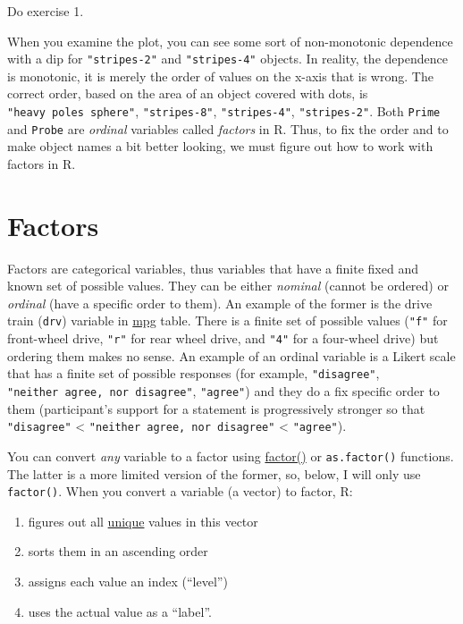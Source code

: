 \documentclass[
]{book}
\providecommand{\tightlist}{%
  \setlength{\itemsep}{0pt}\setlength{\parskip}{0pt}}
\begin{document}
Do exercise 1.

When you examine the plot, you can see some sort of non-monotonic dependence with a dip for \texttt{"stripes-2"} and \texttt{"stripes-4"} objects. In reality, the dependence is monotonic, it is merely the order of values on the x-axis that is wrong. The correct order, based on the area of an object covered with dots, is \texttt{"heavy\ poles\ sphere"}, \texttt{"stripes-8"}, \texttt{"stripes-4"}, \texttt{"stripes-2"}. Both \texttt{Prime} and \texttt{Probe} are \emph{ordinal} variables called \emph{factors} in R. Thus, to fix the order and to make object names a bit better looking, we must figure out how to work with factors in R.

\hypertarget{factors}{%
\section{Factors}\label{factors}}

Factors are categorical variables, thus variables that have a finite fixed and known set of possible values. They can be either \emph{nominal} (cannot be ordered) or \emph{ordinal} (have a specific order to them). An example of the former is the drive train (\texttt{drv}) variable in \href{https://ggplot2.tidyverse.org/reference/mpg.html}{mpg} table. There is a finite set of possible values (\texttt{"f"} for front-wheel drive, \texttt{"r"} for rear wheel drive, and \texttt{"4"} for a four-wheel drive) but ordering them makes no sense. An example of an ordinal variable is a Likert scale that has a finite set of possible responses (for example, \texttt{"disagree"}, \texttt{"neither\ agree,\ nor\ disagree"}, \texttt{"agree"}) and they do a fix specific order to them (participant's support for a statement is progressively stronger so that \texttt{"disagree"} \textless{} \texttt{"neither\ agree,\ nor\ disagree"} \textless{} \texttt{"agree"}).

You can convert \emph{any} variable to a factor using \href{https://stat.ethz.ch/R-manual/R-devel/library/base/html/factor.html}{factor()} or \texttt{as.factor()} functions. The latter is a more limited version of the former, so, below, I will only use \texttt{factor()}. When you convert a variable (a vector) to factor, R:

\begin{enumerate}
\def\labelenumi{\arabic{enumi}.}
\tightlist
\item
  figures out all \href{https://stat.ethz.ch/R-manual/R-devel/library/base/html/unique.html}{unique} values in this vector
\item
  sorts them in an ascending order
\item
  assigns each value an index (``level'')
\item
  uses the actual value as a ``label''.
\end{enumerate}
\end{document}
